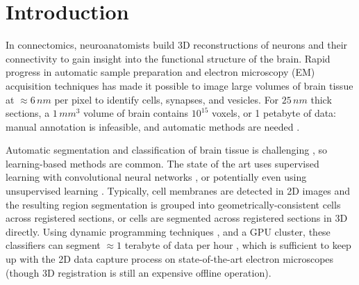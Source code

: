 \section{Introduction}


In connectomics, neuroanatomists build 3D reconstructions of neurons and their connectivity to gain insight into the functional structure of the brain. Rapid progress in automatic sample preparation and electron microscopy (EM) acquisition techniques has made it possible to image large volumes of brain tissue at $\approx6\, nm$ per pixel to identify cells, synapses, and vesicles. For $25\, nm$ thick sections, a $1\, mm^3$ volume of brain contains $10^{15}$ voxels, or 1 petabyte of data: manual annotation is infeasible, and automatic methods are needed \cite{jain2010,Liu2014,GALA2014,kaynig2015large}.

Automatic segmentation and classification of brain tissue is challenging \cite{isbi_challenge}, so learning-based methods are common. The state of the art uses supervised learning with convolutional neural networks \cite{Ciresan:2012f}, or potentially even using unsupervised learning \cite{BogovicHJ13}. Typically, cell membranes are detected in 2D images and the resulting region segmentation is grouped into geometrically-consistent cells across registered sections, or cells are segmented across registered sections in 3D directly. Using dynamic programming techniques \cite{Masci:2013a}, and a GPU cluster, these classifiers can segment  $\approx1$ terabyte of data per hour \cite{kasthuri2015saturated}, which is sufficient to keep up with the 2D data capture process on state-of-the-art electron microscopes (though 3D registration is still an expensive offline operation).


